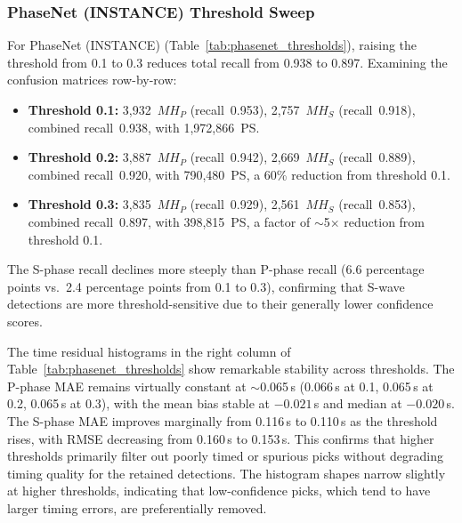\subsubsection{PhaseNet (INSTANCE) Threshold Sweep}
For PhaseNet (INSTANCE) (Table~\ref{tab:phasenet_thresholds}), raising the
threshold from 0.1 to 0.3 reduces total recall from 0.938 to 0.897. Examining
the confusion matrices row-by-row:
\begin{itemize}
  \item \textbf{Threshold 0.1:} 3,932~$MH_P$ (recall~0.953), 2,757~$MH_S$
    (recall~0.918), combined recall~0.938, with 1,972,866~PS.
  \item \textbf{Threshold 0.2:} 3,887~$MH_P$ (recall~0.942), 2,669~$MH_S$
    (recall~0.889), combined recall~0.920, with 790,480~PS, a 60\% reduction
    from threshold 0.1.
  \item \textbf{Threshold 0.3:} 3,835~$MH_P$ (recall~0.929), 2,561~$MH_S$
    (recall~0.853), combined recall~0.897, with 398,815~PS, a factor of
    $\sim$5$\times$ reduction from threshold 0.1.
\end{itemize}
The S-phase recall declines more steeply than P-phase recall (6.6 percentage
points vs.\ 2.4 percentage points from 0.1 to 0.3), confirming that S-wave
detections are more threshold-sensitive due to their generally lower confidence
scores.

The time residual histograms in the right column of
Table~\ref{tab:phasenet_thresholds} show remarkable stability across
thresholds. The P-phase MAE remains virtually constant at $\sim$0.065\,s
(0.066\,s at 0.1, 0.065\,s at 0.2, 0.065\,s at 0.3), with the mean bias stable
at $-0.021$\,s and median at $-0.020$\,s. The S-phase MAE improves marginally
from 0.116\,s to 0.110\,s as the threshold rises, with RMSE decreasing from
0.160\,s to 0.153\,s. This confirms that higher thresholds primarily filter out
poorly timed or spurious picks without degrading timing quality for the
retained detections. The histogram shapes narrow slightly at higher thresholds,
indicating that low-confidence picks, which tend to have larger timing errors,
are preferentially removed.

